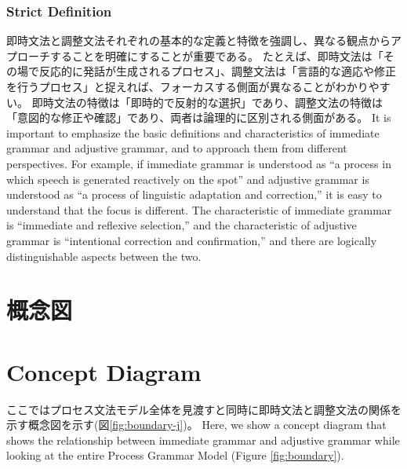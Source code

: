 \documentclass[a4paper,xelatex,ja=standard]{bxjsarticle}
\begin{document}
\subsubsection{Strict Definition}
\fi

\ifJPN
即時文法と調整文法それぞれの基本的な定義と特徴を強調し、異なる観点からアプローチすることを明確にすることが重要である。
たとえば、即時文法は「その場で反応的に発話が生成されるプロセス」、調整文法は「言語的な適応や修正を行うプロセス」と捉えれば、フォーカスする側面が異なることがわかりやすい。
即時文法の特徴は「即時的で反射的な選択」であり、調整文法の特徴は「意図的な修正や確認」であり、両者は論理的に区別される側面がある。
\else
It is important to emphasize the basic definitions and characteristics of immediate grammar and adjustive grammar, and to approach them from different perspectives.
For example, if immediate grammar is understood as ``a process in which speech is generated reactively on the spot'' and adjustive grammar is understood as ``a process of linguistic adaptation and correction,'' it is easy to understand that the focus is different.
The characteristic of immediate grammar is ``immediate and reflexive selection,'' and the characteristic of adjustive grammar is ``intentional correction and confirmation,'' and there are logically distinguishable aspects between the two.
\fi

\ifJPN
  \section{概念図}%
\else
  \section{Concept Diagram}%
\fi

\ifJPN
ここではプロセス文法モデル全体を見渡すと同時に即時文法と調整文法の関係を示す概念図を示す(図\ref{fig:boundary-j})。
\else 
  Here, we show a concept diagram that shows the relationship between immediate grammar and adjustive grammar while looking at the entire Process Grammar Model (Figure \ref{fig:boundary}).
\fi
\end{document}
